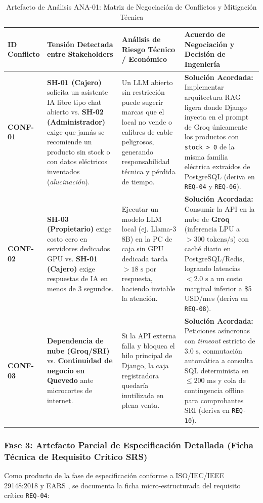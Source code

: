 \begin{table}[htbp]
\centering
\scriptsize
\caption{Artefacto de Análisis ANA-01: Matriz de Negociación de Conflictos y Mitigación Técnica}
\label{tab:artefacto_analisis}
\begin{tabularx}{\textwidth}{l Y Y Y}
\toprule
\textbf{ID Conflicto} & \textbf{Tensión Detectada entre Stakeholders} & \textbf{Análisis de Riesgo Técnico / Económico} & \textbf{Acuerdo de Negociación y Decisión de Ingeniería} \\
\midrule
\textbf{CONF-01} & \textbf{SH-01 (Cajero)} solicita un asistente IA libre tipo chat abierto vs. \textbf{SH-02 (Administrador)} exige que jamás se recomiende un producto sin stock o con datos eléctricos inventados (\textit{alucinación}). & Un LLM abierto sin restricción puede sugerir marcas que el local no vende o calibres de cable peligrosos, generando responsabilidad técnica y pérdida de tiempo. & \textbf{Solución Acordada:} Implementar arquitectura RAG ligera donde Django inyecta en el prompt de Groq únicamente los productos con \texttt{stock > 0} de la misma familia eléctrica extraídos de PostgreSQL (deriva en \texttt{REQ-04} y \texttt{REQ-06}). \\
\midrule
\textbf{CONF-02} & \textbf{SH-03 (Propietario)} exige costo cero en servidores dedicados GPU vs. \textbf{SH-01 (Cajero)} exige respuestas de IA en menos de 3 segundos. & Ejecutar un modelo LLM local (ej. Llama-3 8B) en la PC de caja sin GPU dedicada tarda $>18\text{ s}$ por respuesta, haciendo inviable la atención. & \textbf{Solución Acordada:} Consumir la API en la nube de \textbf{Groq} (inferencia LPU a $>300\text{ tokens/s}$) con caché diario en PostgreSQL/Redis, logrando latencias $<2.0\text{ s}$ a un costo marginal inferior a \$5 USD/mes (deriva en \texttt{REQ-08}). \\
\midrule
\textbf{CONF-03} & \textbf{Dependencia de nube (Groq/SRI)} vs. \textbf{Continuidad de negocio en Quevedo} ante microcortes de internet. & Si la API externa falla y bloquea el hilo principal de Django, la caja registradora quedaría inutilizada en plena venta. & \textbf{Solución Acordada:} Peticiones asíncronas con \textit{timeout} estricto de $3.0\text{ s}$, conmutación automática a consulta SQL determinista en $\le 200\text{ ms}$ y cola de contingencia offline para comprobantes SRI (deriva en \texttt{REQ-10}). \\
\bottomrule
\end{tabularx}
\end{table}

\subsubsection{Fase 3: Artefacto Parcial de Especificación Detallada (Ficha Técnica de Requisito Crítico SRS)}
Como producto de la fase de especificación conforme a ISO/IEC/IEEE 29148:2018 \cite{ieee29148} y EARS \cite{mavin2009ears}, se documenta la ficha micro-estructurada del requisito crítico \texttt{REQ-04}:

